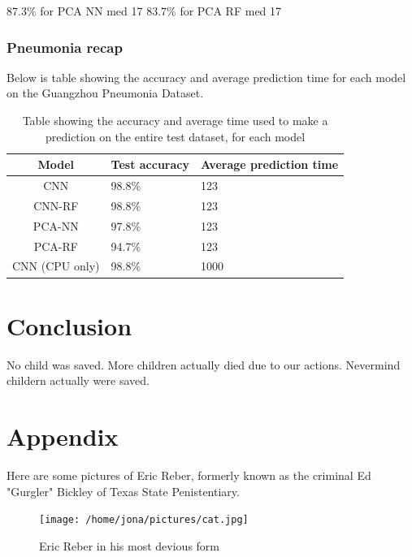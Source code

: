 \documentclass[onecolumn,10pt,cleanfoot]{asme2ej}
\begin{document}
$87.3\%$ for PCA NN med 17
$83.7\%$ for PCA RF med 17

\subsubsection{Pneumonia recap}

Below is table showing the accuracy and average prediction time for each model on the Guangzhou Pneumonia Dataset.

\begin{table}[H]
\caption{Table showing the accuracy and average time used to make a prediction on the entire test dataset, for each model}
\begin{center}
\label{pcanntable}
\begin{tabular}{| c | l | l |}
\hline
Model & Test accuracy & Average prediction time \\
\hline
CNN & 98.8\% & 123 \\
CNN-RF & 98.8\% & 123 \\
PCA-NN & 97.8\% & 123 \\
PCA-RF & 94.7\% & 123 \\
CNN (CPU only) & 98.8\% & 1000 \\
\hline
\end{tabular}
\end{center}
\end{table}

\section{Conclusion}

No child was saved. More children actually died due to our actions. Nevermind childern actually were saved.




\section*{Appendix}

Here are some pictures of Eric Reber, formerly known as the criminal Ed "Gurgler" Bickley of Texas State Penistentiary.


\begin{figure}[h]
\centerline{\texttt{[image: /home/jona/pictures/cat.jpg]}}
\caption{Eric Reber in his most devious form}
\label{real1msetraintest}
\end{figure}
\end{document}
